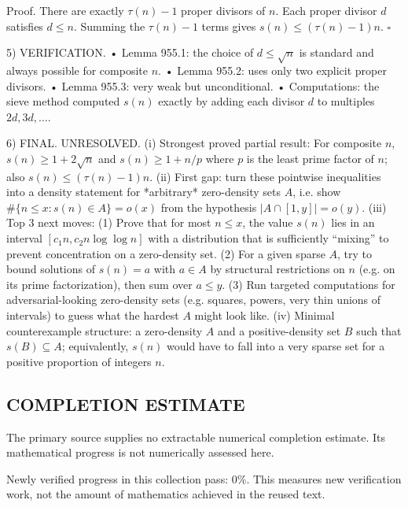 Proof.
There are exactly $\tau(n)-1$ proper divisors of $n$.
Each proper divisor $d$ satisfies $d\le n$.
Summing the $\tau(n)-1$ terms gives $s(n)\le (\tau(n)-1)n$.
\hfill $\square$

5) VERIFICATION.
• Lemma 955.1: the choice of $d\le \sqrt{n}$ is standard and always possible for composite $n$.
• Lemma 955.2: uses only two explicit proper divisors.
• Lemma 955.3: very weak but unconditional.
• Computations: the sieve method computed $s(n)$ exactly by adding each divisor $d$ to multiples $2d,3d,\dots$.

6) FINAL.
UNRESOLVED.
(i) Strongest proved partial result: For composite $n$, $s(n)\ge 1+2\sqrt{n}$ and $s(n)\ge 1+n/p$ where $p$ is the least prime factor of $n$; also $s(n)\le (\tau(n)-1)n$.
(ii) First gap: turn these pointwise inequalities into a density statement for *arbitrary* zero-density sets $A$, i.e. show $\#\{n\le x: s(n)\in A\}=o(x)$ from the hypothesis $|A\cap[1,y]|=o(y)$.
(iii) Top 3 next moves:
  (1) Prove that for most $n\le x$, the value $s(n)$ lies in an interval $[c_1 n, c_2 n\log\log n]$ with a distribution that is sufficiently “mixing” to prevent concentration on a zero-density set.
  (2) For a given sparse $A$, try to bound solutions of $s(n)=a$ with $a\in A$ by structural restrictions on $n$ (e.g. on its prime factorization), then sum over $a\le y$.
  (3) Run targeted computations for adversarial-looking zero-density sets (e.g. squares, powers, very thin unions of intervals) to guess what the hardest $A$ might look like.
(iv) Minimal counterexample structure: a zero-density $A$ and a positive-density set $B$ such that $s(B)\subseteq A$; equivalently, $s(n)$ would have to fall into a very sparse set for a positive proportion of integers $n$.




\subsection*{COMPLETION ESTIMATE}
The primary source supplies no extractable numerical completion estimate. Its mathematical progress is not numerically assessed here.

Newly verified progress in this collection pass: $0\%$. This measures new verification work, not the amount of mathematics achieved in the reused text.
